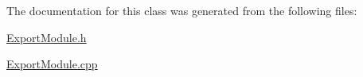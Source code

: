 The documentation for this class was generated from the following files\-:\begin{DoxyCompactItemize}
\item 
\hyperlink{_export_module_8h}{Export\-Module.\-h}\item 
\hyperlink{_export_module_8cpp}{Export\-Module.\-cpp}\end{DoxyCompactItemize}
